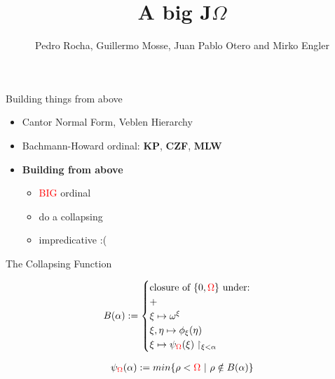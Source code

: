 \documentclass{beamer}
\title{A big J$\Omega$\text{mp in the Ordinals }}
\author{Pedro Rocha, Guillermo Mosse, Juan Pablo Otero and Mirko Engler}
\begin{document}
\maketitle


\begin{frame}{Building things from above}
	\begin{itemize}
		\item<1-> Cantor Normal Form, Veblen Hierarchy 
		\item<2-> Bachmann-Howard ordinal: \textbf{KP}, \textbf{CZF}, \textbf{MLW}
		\item<3-> \textbf{Building from above}
			\begin{itemize}
				\item<4-> \textcolor{red}{BIG} ordinal 
				\item<5-> do a collapsing
				\item<6-> impredicative :( 
			\end{itemize}
	\end{itemize}
\end{frame}


\begin{frame}{The Collapsing Function}
\centering
\begin{minipage}{0.45\textwidth}
	\begin{align*}
		B(\alpha) := 
		\begin{cases}
			\text{closure of } \{0, \textcolor{red}{\Omega}\} \text{ under:} \\
			+ \\
			 \xi \mapsto \omega^\xi \\ 
			 \xi, \eta \mapsto \phi_{\xi}(\eta) \\ 
			\xi \mapsto \psi_{\textcolor{red}{\Omega}}(\xi) \upharpoonright_{\xi < \alpha} 
		\end{cases}\\
	\end{align*}
    \end{minipage}\hfill
    
    
    \begin{minipage}{0.45\textwidth}
	\begin{align*}
		\psi_{\textcolor{red}{\Omega}}(\alpha) := min\{ \rho < \textcolor{red}{\Omega} \  | \  \rho \notin B(\alpha) \} 
	\end{align*}
    \end{minipage}
\end{frame}
\end{document}
